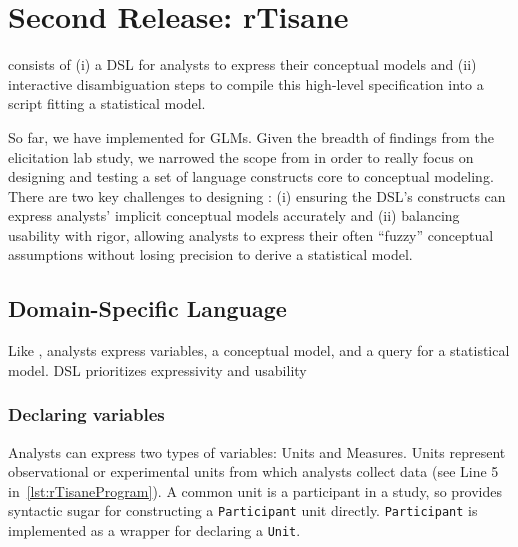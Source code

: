 \rTisaneProgram
\section{Second Release: rTisane} \label{sec:rTisane}

\rTisane consists of (i) a DSL for analysts to express their conceptual
models and (ii) interactive disambiguation steps to compile this high-level specification into a
script fitting a statistical model. 

So far, we have implemented \rTisane for GLMs. Given the breadth of findings
from the elicitation lab study, we narrowed the scope from \tisane in order to
really focus on designing and testing a set of language constructs core to
conceptual modeling. 
There are two key challenges to designing \rTisane: (i) ensuring the DSL's
constructs can express analysts' implicit conceptual models accurately and (ii) %
balancing usability with rigor, allowing
analysts to express their often ``fuzzy'' conceptual assumptions without losing
precision to derive a statistical model.

\def\Participant{\texttt{Participant}\xspace}
\def\Unit{\texttt{Unit}\xspace}
\def\Condition{\texttt{Condition}\xspace}
\def\Conditions{\texttt{Condition}s\xspace}

\subsection{\rTisanes Domain-Specific Language}
Like \tisane, analysts express variables, a conceptual model, and a query for a
statistical model. \rTisanes DSL prioritizes expressivity and usability 

\subsubsection{Declaring variables}
Analysts can express two types of variables: Units and Measures. Units represent
observational or experimental units from which analysts collect data (see Line 5 in~\autoref{lst:rTisaneProgram}). 
A common unit is a participant in a study, so \rTisane provides syntactic sugar for
constructing a \Participant unit directly. \Participant is implemented as a wrapper for
declaring a \Unit.

